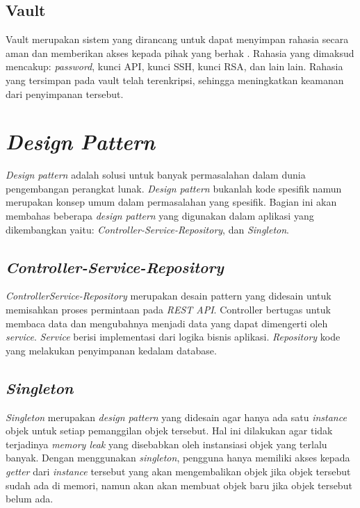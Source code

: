 \subsection{Vault}
\label{sec:vault}

Vault merupakan sistem yang dirancang untuk dapat menyimpan rahasia secara aman dan memberikan akses kepada pihak yang berhak \citep{lugger_2020}. Rahasia yang dimaksud mencakup: \textit{password}, kunci API, kunci SSH, kunci RSA, dan lain lain. Rahasia yang tersimpan pada vault telah terenkripsi, sehingga meningkatkan keamanan dari penyimpanan tersebut.
\section{\textit{Design Pattern}}
\label{sec:designPattern}
\textit{Design pattern} adalah solusi untuk banyak permasalahan dalam dunia pengembangan perangkat lunak\citep{shvets_2014dp}. \textit{Design pattern} bukanlah kode spesifik namun merupakan konsep umum dalam permasalahan yang spesifik. Bagian ini akan membahas beberapa \textit{design pattern} yang digunakan dalam aplikasi yang dikembangkan yaitu: \textit{Controller-Service-Repository}, dan \textit{Singleton}. 

\subsection{\textit{Controller-Service-Repository}}
\label{sec:modelsViewController}

\textit{ControllerService-Repository} merupakan desain pattern yang didesain untuk memisahkan proses permintaan pada \textit{REST API}\citep{collings_2021}. Controller bertugas untuk membaca data dan mengubahnya menjadi data yang dapat dimengerti oleh \textit{service}. \textit{Service} berisi implementasi dari logika bisnis aplikasi. \textit{Repository} kode yang melakukan penyimpanan kedalam database.
\subsection{\textit{Singleton}}
\label{sec:singleton}
\textit{Singleton} merupakan \textit{design pattern} yang didesain agar hanya ada satu \textit{instance} objek untuk setiap pemanggilan objek tersebut. Hal ini dilakukan agar tidak terjadinya \textit{memory leak} yang disebabkan oleh instansiasi objek yang terlalu banyak. Dengan menggunakan \textit{singleton}, pengguna hanya memiliki akses kepada \textit{getter} dari \textit{instance} tersebut yang akan mengembalikan objek jika objek tersebut sudah ada di memori, namun akan akan membuat objek baru jika objek tersebut belum ada\citep{shvets_2014st}.
